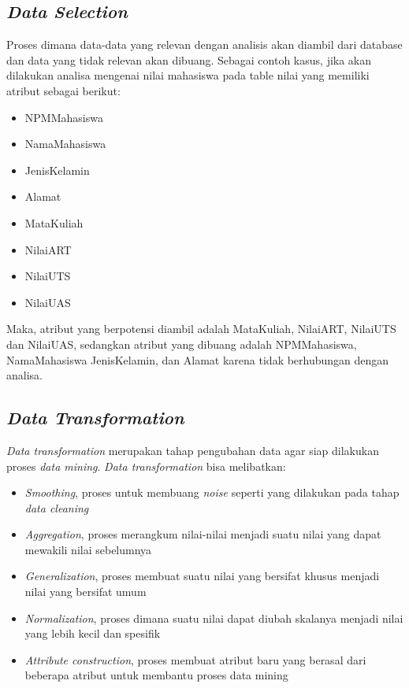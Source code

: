 \subsection{\textsl{Data Selection}}
Proses dimana data-data yang relevan dengan analisis akan diambil dari database dan data yang tidak relevan akan dibuang. Sebagai contoh kasus, jika akan dilakukan analisa mengenai nilai mahasiswa pada table nilai yang memiliki atribut sebagai berikut:
	\begin{itemize}
		\item NPMMahasiswa
		\item NamaMahasiswa
		\item JenisKelamin
		\item Alamat
		\item MataKuliah
		\item NilaiART
		\item NilaiUTS
		\item NilaiUAS
	\end{itemize}
Maka, atribut yang berpotensi diambil adalah MataKuliah, NilaiART, NilaiUTS dan NilaiUAS, sedangkan atribut yang dibuang adalah NPMMahasiswa, NamaMahasiswa JenisKelamin, dan Alamat karena tidak  berhubungan dengan analisa.

\subsection{\textsl{Data Transformation}}
\textsl{Data transformation} merupakan tahap pengubahan data agar siap dilakukan proses \textsl{data mining}. \textsl{Data transformation} bisa melibatkan:
	\begin{itemize}
		\item \textsl{Smoothing}, proses untuk membuang \textsl{noise} seperti yang dilakukan pada tahap \textsl{data cleaning}
		\item \textsl{Aggregation}, proses merangkum nilai-nilai menjadi suatu nilai yang dapat mewakili nilai sebelumnya
		\item \textsl{Generalization}, proses membuat suatu nilai yang bersifat khusus menjadi nilai yang bersifat umum
		\item \textsl{Normalization}, proses dimana suatu nilai dapat diubah skalanya menjadi nilai yang lebih kecil dan spesifik
		\item \textsl{Attribute construction}, proses membuat atribut baru yang berasal dari beberapa atribut untuk membantu proses data mining
	\end{itemize}
	
